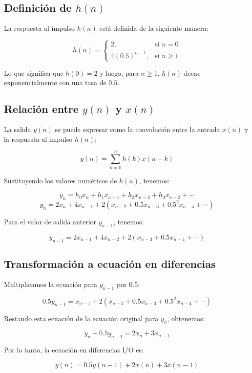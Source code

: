 \documentclass[10pt]{article}
\theoremstyle{definition}
\theoremstyle{remark}
\theoremstyle{definition}
\numberwithin{equation}{prob}
\begin{document}
\subsection*{Definición de \( h(n) \)}

La respuesta al impulso \( h(n) \) está definida de la siguiente manera:

\[
h(n) = 
\begin{cases} 
2, & \text{si } n = 0 \\
4(0.5)^{n-1}, & \text{si } n \geq 1 
\end{cases}
\]

Lo que significa que \( h(0) = 2 \) y luego, para \( n \geq 1 \), \( h(n) \) decae exponencialmente con una tasa de \( 0.5 \).

\subsection*{Relación entre \( y(n) \) y \( x(n) \)}

La salida \( y(n) \) se puede expresar como la convolución entre la entrada \( x(n) \) y la respuesta al impulso \( h(n) \):

\[
y(n) = \sum_{k=0}^{n} h(k) x(n-k)
\]

Sustituyendo los valores numéricos de \( h(n) \), tenemos:

\[
y_n = h_0 x_n + h_1 x_{n-1} + h_2 x_{n-2} + h_3 x_{n-3} + \cdots
\]
\[
y_n = 2x_n + 4x_{n-1} + 2 \left( x_{n-2} + 0.5x_{n-3} + 0.5^2 x_{n-4} + \cdots \right)
\]

Para el valor de salida anterior \( y_{n-1} \), tenemos:

\[
y_{n-1} = 2x_{n-1} + 4x_{n-2} + 2 \left( x_{n-3} + 0.5x_{n-4} + \cdots \right)
\]

\subsection*{Transformación a ecuación en diferencias}

Multiplicamos la ecuación para \( y_{n-1} \) por 0.5:

\[
0.5 y_{n-1} = x_{n-1} + 2 \left( x_{n-2} + 0.5 x_{n-3} + 0.5^2 x_{n-4} + \cdots \right)
\]

Restando esta ecuación de la ecuación original para \( y_n \), obtenemos:

\[
y_n - 0.5 y_{n-1} = 2x_n + 3x_{n-1}
\]

Por lo tanto, la ecuación en diferencias I/O es:

\[
y(n) = 0.5 y(n-1) + 2x(n) + 3x(n-1)
\]
\end{document}
